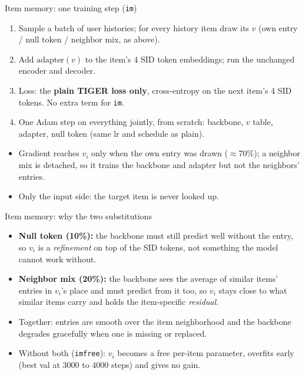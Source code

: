 \documentclass{beamer}
\begin{document}
\begin{frame}{Item memory: one training step (\texttt{im})}
\begin{enumerate}
  \item Sample a batch of user histories; for every history item draw its
        $v$ (own entry / null token / neighbor mix, as above).
  \item Add $\text{adapter}(v)$ to the item's 4 SID token embeddings; run the
        unchanged encoder and decoder.
  \item Loss: the \textbf{plain TIGER loss only}, cross-entropy on the next
        item's 4 SID tokens. No extra term for \texttt{im}.
  \item One Adam step on everything jointly, from scratch: backbone, $v$
        table, adapter, null token (same lr and schedule as plain).
\end{enumerate}
\begin{itemize}
  \item Gradient reaches $v_i$ only when the own entry was drawn ($\approx$70\%);
        a neighbor mix is detached, so it trains the backbone and adapter
        but not the neighbors' entries.
  \item Only the input side: the target item is never looked up.
\end{itemize}
\end{frame}

\begin{frame}{Item memory: why the two substitutions}
\begin{itemize}
  \item \textbf{Null token (10\%):} the backbone must still predict well
        without the entry, so $v_i$ is a \emph{refinement} on top of the SID
        tokens, not something the model cannot work without.
  \item \textbf{Neighbor mix (20\%):} the backbone sees the average of
        similar items' entries in $v_i$'s place and must predict from it too,
        so $v_i$ stays close to what similar items carry and holds the
        item-specific \emph{residual}.
  \item Together: entries are smooth over the item neighborhood and the
        backbone degrades gracefully when one is missing or replaced.
  \item Without both (\texttt{imfree}): $v_i$ becomes a free per-item
        parameter, overfits early (best val at 3000 to 4000 steps) and gives
        no gain.
\end{itemize}
\end{frame}
\end{document}
